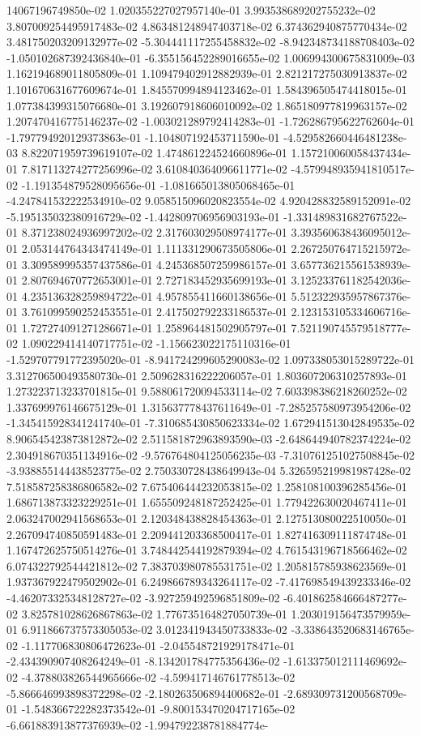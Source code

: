 14067196749850e-02	1.020355227027957140e-01	3.993538689202755232e-02	3.807009254495917483e-02	4.863481248947403718e-02	6.374362940875770434e-02	3.481750203209132977e-02	-5.304441117255458832e-02	-8.942348734188708403e-02	-1.050102687392436840e-01	-6.355156452289016655e-02	1.006994300675831009e-03	1.162194689011805809e-01	1.109479402912882939e-01	2.821217275030913837e-02	1.101670631677609674e-01	1.845570994894123462e-01	1.584396505474418015e-01	1.077384399315076680e-01	3.192607918606010092e-02	1.865180977819963157e-02	1.207470416775146237e-02	-1.003021289792414283e-01	-1.726286795622762604e-01	-1.797794920129373863e-01	-1.104807192453711590e-01	-4.529582660446481238e-03	8.822071959739619107e-02	1.474861224524660896e-01	1.157210060058437434e-01	7.817113274277256996e-02	3.610840364096611771e-02	-4.579948935941810517e-02	-1.191354879528095656e-01	-1.081665013805068465e-01	-4.247841532222534910e-02	9.058515096020823554e-02	4.920428832589152091e-02	-5.195135032380916729e-02	-1.442809706956903193e-01	-1.331489831682767522e-01	8.371238024936997202e-02	2.317603029508974177e-01	3.393560638436095012e-01	2.053144764343474149e-01	1.111331290673505806e-01	2.267250764715215972e-01	3.309589995357437586e-01	4.245368507259986157e-01	3.657736215561538939e-01	2.807694670772653001e-01	2.727183452935699193e-01	3.125233761182542036e-01	4.235136328259894722e-01	4.957855411660138656e-01	5.512322935957867376e-01	3.761099590252453551e-01	2.417502792233186537e-01	2.123153105334606716e-01	1.727274091271286671e-01	1.258964481502905797e-01	7.521190745579518777e-02	1.090229414140717751e-02	-1.156623022175110316e-01	-1.529707791772395020e-01	-8.941724299605290083e-02	1.097338053015289722e-01	3.312706500493580730e-01	2.509628316222206057e-01	1.803607206310257893e-01	1.273223713233701815e-01	9.588061720094533114e-02	7.603398386218260252e-02	1.337699976146675129e-01	1.315637778437611649e-01	-7.285257580973954206e-02	-1.345415928341241740e-01	-7.310685430850623334e-02	1.672941513042849535e-02	8.906545423873812872e-02	2.511581872963893590e-03	-2.648644940782374224e-02	2.304918670351134916e-02	-9.576764804125056235e-03	-7.310761251027508845e-02	-3.938855144438523775e-02	2.750330728438649943e-04	5.326595219981987428e-02	7.518587258386806582e-02	7.675406444232053815e-02	1.258108100396285456e-01	1.686713873323229251e-01	1.655509248187252425e-01	1.779422630020467411e-01	2.063247002941568653e-01	2.120348438828454363e-01	2.127513080022510050e-01	2.267094740850591483e-01	2.209441203368500417e-01	1.827416309111874748e-01	1.167472625750514276e-01	3.748442544192879394e-02	4.761543196718566462e-02	6.074322792544421812e-02	7.383703980785531751e-02	1.205815785938623569e-01	1.937367922479502902e-01	6.249866789343264117e-02	-7.417698549439233346e-02	-4.462073325348128727e-02	-3.927259492596851809e-02	-6.401862584666487277e-02	3.825781028626867863e-02	1.776735164827050739e-01	1.203019156473579959e-01	6.911866737573305053e-02	3.012341943450733833e-02	-3.338643520683146765e-02	-1.117706830806472623e-01	-2.045548721929178471e-01	-2.434390907408264249e-01	-8.134201784775356436e-02	-1.613375012111469692e-02	-4.378803826544965666e-02	-4.599417146761778513e-02	-5.866646993898372298e-02	-2.180263506894400682e-01	-2.689309731200568709e-01	-1.548366722282373542e-01	-9.800153470204717165e-02	-6.661883913877376939e-02	-1.994792238781884774e-